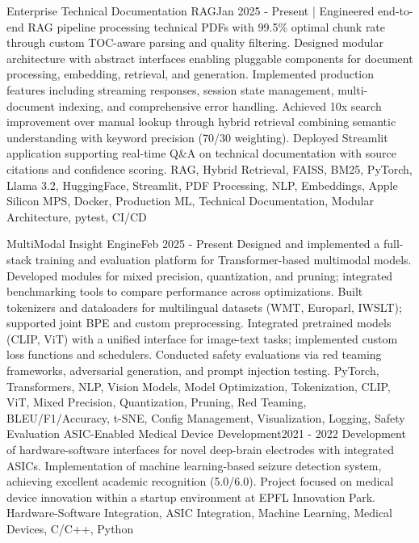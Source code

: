 %
%
%

\vspace*{-5mm}
\begin{projects}
\project
{Enterprise Technical Documentation RAG}{Jan 2025 - Present}
{| }
{Engineered end-to-end RAG pipeline processing technical PDFs with 99.5\% optimal chunk rate through custom TOC-aware parsing and quality filtering.
Designed modular architecture with abstract interfaces enabling pluggable components for document processing, embedding, retrieval, and generation.
Implemented production features including streaming responses, session state management, multi-document indexing, and comprehensive error handling.
Achieved 10x search improvement over manual lookup through hybrid retrieval combining semantic understanding with keyword precision (70/30 weighting).
Deployed Streamlit application supporting real-time Q\&A on technical documentation with source citations and confidence scoring.}
{RAG, Hybrid Retrieval, FAISS, BM25, PyTorch, Llama 3.2, HuggingFace, Streamlit, PDF Processing, NLP, Embeddings, Apple Silicon MPS, Docker, Production ML, Technical Documentation, Modular Architecture, pytest, CI/CD}

\project
{MultiModal Insight Engine}{Feb 2025 - Present}
{}
{Designed and implemented a full-stack training and evaluation platform for Transformer-based multimodal models.
Developed modules for mixed precision, quantization, and pruning; integrated benchmarking tools to compare performance across optimizations.
Built tokenizers and dataloaders for multilingual datasets (WMT, Europarl, IWSLT); supported joint BPE and custom preprocessing.
Integrated pretrained models (CLIP, ViT) with a unified interface for image-text tasks; implemented custom loss functions and schedulers.
Conducted safety evaluations via red teaming frameworks, adversarial generation, and prompt injection testing.}
{PyTorch, Transformers, NLP, Vision Models, Model Optimization, Tokenization, CLIP, ViT, Mixed Precision, Quantization, Pruning, Red Teaming, BLEU/F1/Accuracy, t-SNE, Config Management, Visualization, Logging, Safety Evaluation}
\newpage
\project
{ASIC-Enabled Medical Device Development}{2021 - 2022}
{}
{Development of hardware-software interfaces for novel deep-brain electrodes with integrated ASICs. Implementation of machine learning-based seizure detection system, achieving excellent academic recognition (5.0/6.0). Project focused on medical device innovation within a startup environment at EPFL Innovation Park.}
{Hardware-Software Integration, ASIC Integration, Machine Learning, Medical Devices, C/C++, Python}


\end{projects}
